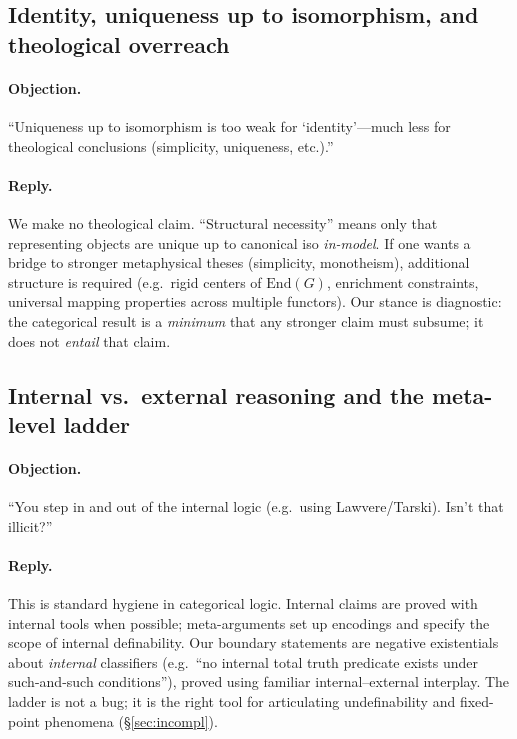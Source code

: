 \documentclass[11pt]{article}
\theoremstyle{upright}
\begin{document}
\subsection{Identity, uniqueness up to isomorphism, and theological overreach}
\paragraph{Objection.}
“Uniqueness up to isomorphism is too weak for `identity'—much less for theological conclusions (simplicity, uniqueness, etc.).”

\paragraph{Reply.}
We make no theological claim. “Structural necessity” means only that representing objects are unique up to canonical iso \emph{in-model}. If one wants a bridge to stronger metaphysical theses (simplicity, monotheism), additional structure is required (e.g.\ rigid centers of \(\mathrm{End}(G)\), enrichment constraints, universal mapping properties across multiple functors). Our stance is diagnostic: the categorical result is a \emph{minimum} that any stronger claim must subsume; it does not \emph{entail} that claim.

\subsection{Internal vs.\ external reasoning and the meta-level ladder}
\paragraph{Objection.}
“You step in and out of the internal logic (e.g.\ using Lawvere/Tarski). Isn’t that illicit?”

\paragraph{Reply.}
This is standard hygiene in categorical logic. Internal claims are proved with internal tools when possible; meta-arguments set up encodings and specify the scope of internal definability. Our boundary statements are negative existentials about \emph{internal} classifiers (e.g.\ “no internal total truth predicate exists under such-and-such conditions”), proved using familiar internal–external interplay. The ladder is not a bug; it is the right tool for articulating undefinability and fixed-point phenomena (\S\ref{sec:incompl}).
\end{document}
